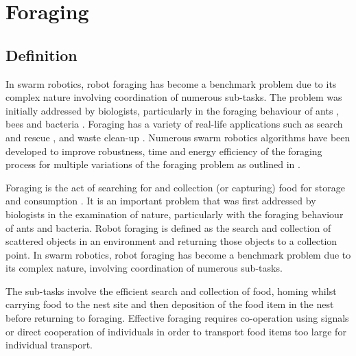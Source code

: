 
\chapter{Foraging}
\label{chap:second}




\section{Definition}
\label{sec:second:definition}

In swarm robotics, robot foraging has become a benchmark problem due to its complex nature involving coordination of numerous sub-tasks. The problem was initially addressed by biologists, particularly in the foraging behaviour of ants \cite{holldobler1990ants,bernstein1974seasonal}, bees \cite{seeley2009wisdom} and bacteria \cite{resnick1994turtles}. Foraging has a variety of real-life applications such as search and rescue \cite{jennings1997cooperative,murphy2000biomimetic}, and waste clean-up \cite{balch1995io}. Numerous swarm robotics algorithms have been developed to improve robustness, time and energy efficiency of the foraging process for multiple variations of the foraging problem as outlined in \cite{winfield2009foraging}. 

Foraging is the act of searching for and collection (or capturing) food for storage and consumption \cite{winfield2009foraging}. It is an important problem that was first addressed by biologists in the examination of nature, particularly with the foraging behaviour of ants and bacteria. Robot foraging is defined as the search and collection of scattered objects in an environment and returning those objects to a collection point. In swarm robotics, robot foraging has become a benchmark problem due to its complex nature, involving coordination of numerous sub-tasks. 

The sub-tasks involve the efficient search and collection of food, homing whilst carrying food to the nest site and then deposition of the food item in the nest before returning to foraging. Effective foraging requires co-operation using signals or direct cooperation of individuals in order to transport food items too large for individual transport.  


